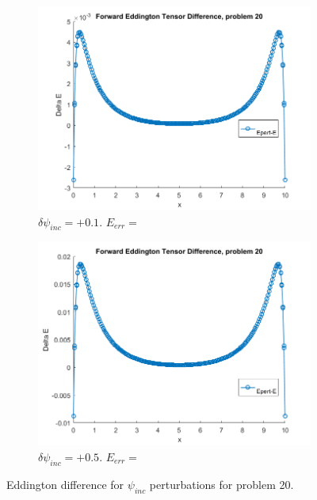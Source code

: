 \documentclass{article}
\begin{document}
\begin{figure}[H]
\centering
\begin{subfigure}{.5\textwidth}
  \centering
  \includegraphics[width=1\linewidth]{p20deltaEdBC0,1.png}
  \caption{$\delta\psi_{inc}=+0.1$. $E_{err}=$}
  \label{fig:sub1}
\end{subfigure}%
\begin{subfigure}{.5\textwidth}
  \centering
  \includegraphics[width=1\linewidth]{p20deltaEdBC0,5.png}
  \caption{$\delta\psi_{inc}=+0.5$. $E_{err}= $}
  \label{fig:sub2}
\end{subfigure}
\caption{Eddington difference for $\psi_{inc}$ perturbations for problem 20.}
\label{fig:test}
\end{figure}
\end{document}
